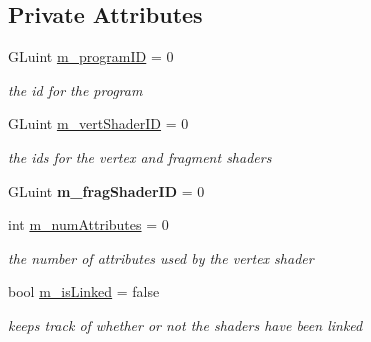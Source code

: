 \subsection*{Private Attributes}
\begin{DoxyCompactItemize}
\item 
\mbox{\label{classnta_1_1GLSLProgram_ad1019aa2ac0a1cbdef1668870d26c3f2}} 
G\+Luint \hyperlink{classnta_1_1GLSLProgram_ad1019aa2ac0a1cbdef1668870d26c3f2}{m\+\_\+program\+ID} = 0
\begin{DoxyCompactList}\small\item\em the id for the program \end{DoxyCompactList}\item 
\mbox{\label{classnta_1_1GLSLProgram_a77478858f3885fba34a384ace272565a}} 
G\+Luint \hyperlink{classnta_1_1GLSLProgram_a77478858f3885fba34a384ace272565a}{m\+\_\+vert\+Shader\+ID} = 0
\begin{DoxyCompactList}\small\item\em the ids for the vertex and fragment shaders \end{DoxyCompactList}\item 
\mbox{\label{classnta_1_1GLSLProgram_a4762bd58f72875cdda7513684f530bed}} 
G\+Luint {\bfseries m\+\_\+frag\+Shader\+ID} = 0
\item 
\mbox{\label{classnta_1_1GLSLProgram_aa90cbc60f99bdfc69ef68633e351a118}} 
int \hyperlink{classnta_1_1GLSLProgram_aa90cbc60f99bdfc69ef68633e351a118}{m\+\_\+num\+Attributes} = 0
\begin{DoxyCompactList}\small\item\em the number of attributes used by the vertex shader \end{DoxyCompactList}\item 
\mbox{\label{classnta_1_1GLSLProgram_af133a0d5d2e15fdff99062f9ea742024}} 
bool \hyperlink{classnta_1_1GLSLProgram_af133a0d5d2e15fdff99062f9ea742024}{m\+\_\+is\+Linked} = false
\begin{DoxyCompactList}\small\item\em keeps track of whether or not the shaders have been linked \end{DoxyCompactList}\end{DoxyCompactItemize}
